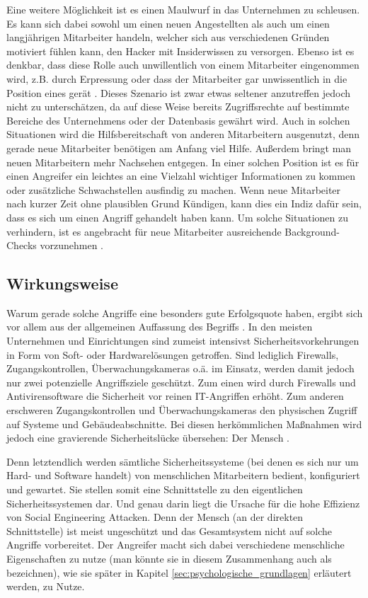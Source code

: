 Eine weitere Möglichkeit ist es einen Maulwurf in das Unternehmen zu schleusen.
Es kann sich dabei sowohl um einen neuen Angestellten als auch um einen langjährigen Mitarbeiter handeln, welcher sich aus verschiedenen Gründen motiviert fühlen kann, den Hacker mit Insiderwissen zu versorgen.
Ebenso ist es denkbar, dass diese Rolle auch unwillentlich von einem Mitarbeiter eingenommen wird, z.B. durch Erpressung oder dass der Mitarbeiter gar unwissentlich in die Position eines  gerät \citep{Dhanjani2009}.
Dieses Szenario ist zwar etwas seltener anzutreffen jedoch nicht zu unterschätzen, da auf diese
Weise bereits Zugriffsrechte auf bestimmte Bereiche des Unternehmens oder der Datenbasis gewährt wird.
Auch in solchen Situationen wird die Hilfsbereitschaft von anderen Mitarbeitern ausgenutzt, denn
gerade neue Mitarbeiter benötigen am Anfang viel Hilfe.
Außerdem bringt man neuen Mitarbeitern mehr Nachsehen entgegen.
In einer solchen Position ist es für einen Angreifer ein leichtes an eine Vielzahl wichtiger
Informationen zu kommen oder zusätzliche Schwachstellen ausfindig zu machen.
Wenn neue Mitarbeiter nach kurzer Zeit ohne plausiblen Grund Kündigen, kann dies ein Indiz dafür sein,
dass es sich um einen Angriff gehandelt haben kann.
Um solche Situationen zu verhindern, ist es angebracht für neue Mitarbeiter ausreichende Background-Checks vorzunehmen \citep{hacking-the-human}.

\subsection{Wirkungsweise}\label{sec:wirkungsweise}

Warum gerade solche Angriffe eine besonders gute Erfolgsquote haben, ergibt sich vor allem aus der allgemeinen Auffassung des Begriffs .
In den meisten Unternehmen und Einrichtungen sind zumeist intensivst Sicherheitsvorkehrungen in Form von Soft- oder Hardwarelösungen getroffen.
Sind lediglich Firewalls, Zugangskontrollen, Überwachungskameras o.ä. im Einsatz, werden damit jedoch nur zwei potenzielle Angriffsziele geschützt.
Zum einen wird durch Firewalls und Antivirensoftware die Sicherheit vor reinen IT-Angriffen erhöht.
Zum anderen erschweren Zugangskontrollen und Überwachungskameras den physischen Zugriff auf Systeme und Gebäudeabschnitte.
Bei diesen herkömmlichen Maßnahmen wird jedoch eine gravierende Sicherheitslücke übersehen: Der Mensch \citep{hacking-the-human}.

Denn letztendlich werden sämtliche Sicherheitssysteme (bei denen es sich nur um Hard- und Software handelt) von menschlichen Mitarbeitern bedient, konfiguriert und gewartet.
Sie stellen somit eine Schnittstelle zu den eigentlichen Sicherheitssystemen dar.
Und genau darin liegt die Ursache für die hohe Effizienz von Social Engineering Attacken.
Denn der Mensch (an der direkten Schnittstelle) ist meist ungeschützt und das Gesamtsystem nicht auf solche Angriffe vorbereitet.
Der Angreifer macht sich dabei verschiedene menschliche Eigenschaften zu nutze (man könnte sie in diesem Zusammenhang auch als  bezeichnen), wie sie später in Kapitel \vref{sec:psychologische_grundlagen} erläutert werden, zu Nutze.

